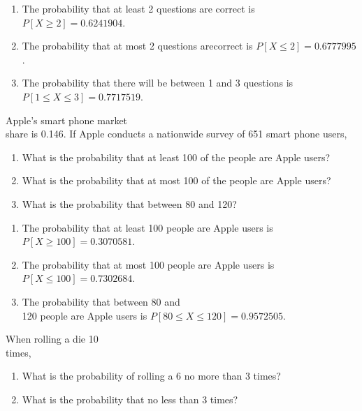 \documentclass[11pt, chapterprefix=true]{scrbook}\usepackage[]{graphicx}\usepackage[]{color}
\begin{document}
\begin{exercises}
\begin{solution}
\begin{enumerate}
\item The probability that at least 2 questions are correct is $P[X \ge 2] = 0.6241904$.
\item The probability that at most 2 questions arecorrect is $P[X \le 2] = 0.6777995$.
\item The probability that there  will be between 1 and 3 questions is $P[1 \le X \le 3] = 0.7717519$.
\end{enumerate}
	\end{solution}

  \begin{exercise} %

Apple's smart phone market \\ share is  0.146. If Apple conducts a nationwide survey of 651 smart phone users,

\begin{enumerate}
\item What is the probability that at least 100 of the people are Apple users?
\item What is the probability that at most 100 of the people are Apple users?
\item What is the probability that between 80 and 120?
\end{enumerate}
	\end{exercise}
	\begin{solution}  %


\begin{enumerate}
\item The probability that at least 100 people are Apple users is $P[X \ge 100] = 0.3070581$.
\item The probability that at most 100 people are Apple users is $P[X \le 100] = 0.7302684$.
\item The probability that between 80 and \\ 120 people are Apple users is $P[ 80 \le X \le 120] = 0.9572505$.
\end{enumerate}
	\end{solution}

  \begin{exercise} %

When rolling a die 10 \\ times,

\begin{enumerate}
\item What is the probability of rolling a 6 no more than 3 times?
\item What is the probability that no less than 3 times?
\end{enumerate}
	\end{exercise}
	\begin{solution}  %




\end{solution}
\end{exercises}
\end{document}
